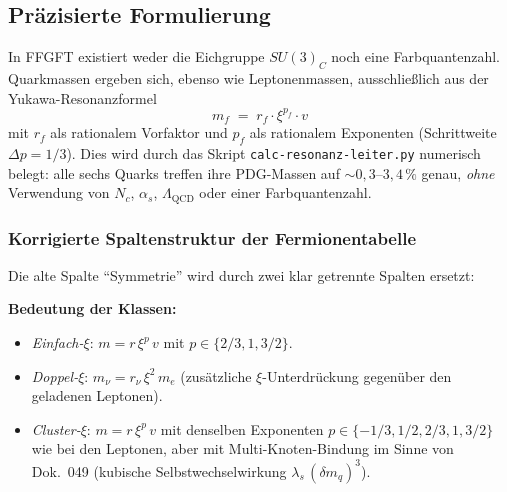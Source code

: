 \subsection*{Präzisierte Formulierung}

In FFGFT existiert weder die Eichgruppe $SU(3)_C$ noch eine
Farbquantenzahl. Quarkmassen ergeben sich, ebenso wie Leptonenmassen,
ausschließlich aus der Yukawa-Resonanzformel
\begin{equation}
  m_f \;=\; r_f \cdot \xi^{p_f} \cdot v
  \tag{190.13}
\end{equation}
mit $r_f$ als rationalem Vorfaktor und $p_f$ als rationalem Exponenten
(Schrittweite $\Delta p = 1/3$). Dies wird durch das Skript
\texttt{calc-resonanz-leiter.py} numerisch belegt: alle sechs Quarks
treffen ihre PDG-Massen auf $\sim 0{,}3\text{--}3{,}4\,\%$ genau,
\emph{ohne} Verwendung von $N_c$, $\alpha_s$, $\Lambda_{\text{QCD}}$
oder einer Farbquantenzahl.

\subsubsection*{Korrigierte Spaltenstruktur der Fermionentabelle}

Die alte Spalte \enquote{Symmetrie} wird durch zwei klar getrennte
Spalten ersetzt:

\begin{center}
{\footnotesize
{}
}
\end{center}

\textbf{Bedeutung der Klassen:}
\begin{itemize}
  \item \emph{Einfach-$\xi$}: $m = r\,\xi^p\,v$ mit $p \in \{2/3, 1, 3/2\}$.
  \item \emph{Doppel-$\xi$}: $m_\nu = r_\nu\,\xi^2\,m_e$
        (zusätzliche $\xi$-Unterdrückung gegenüber den geladenen Leptonen).
  \item \emph{Cluster-$\xi$}: $m = r\,\xi^p\,v$ mit denselben Exponenten
        $p \in \{-1/3, 1/2, 2/3, 1, 3/2\}$ wie bei den Leptonen, aber mit
        Multi-Knoten-Bindung im Sinne von Dok.~049 (kubische
        Selbstwechselwirkung $\lambda_s\,(\delta m_q)^3$).
\end{itemize}

